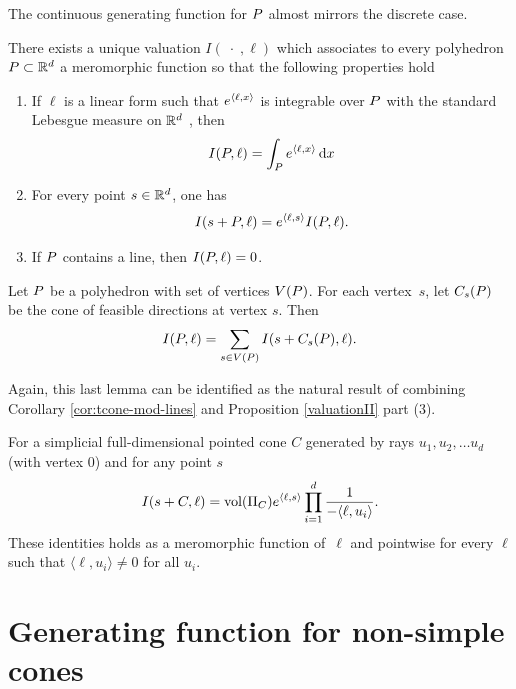 The continuous generating function for ${ P}$ almost mirrors the discrete case. 

\begin{proposition}\label{valuationII}
There exists a unique valuation  $I(\;\cdot\;, \ell)$ which  associates  to every polyhedron
${ P}\subset {\mathbb R}^d$ a meromorphic function so that the following properties hold 

\begin{enumerate}
\item If $\ell$ is a linear form such that $e^{{\langle} \ell, x {\rangle}}$ is integrable over ${ P}$ with the standard Lebesgue measure on ${\mathbb R}^d$ , then 
\[ I({ P},\ell) = \int_{ P} e^{{\langle} \ell, x {\rangle}} \,\mathrm{d} x\]
\item For every point $s \in {\mathbb R}^d$, one has
\[I(s+{ P}, \ell) = e^{{\langle} \ell, s {\rangle}}I({ P},\ell).\]
\item If ${ P}$ contains a line, then $I({ P}, \ell) = 0$.
\end{enumerate}
\end{proposition}


\begin{lemma}  Let ${ P}$ be a polyhedron with set of vertices $V({ P})$. For each
vertex~$s$, let $C_s({ P})$ be the cone of feasible directions at vertex $s$. Then
\begin{equation*}
I({ P},\ell)=\sum_{s\in V({ P})}I(s+C_s({ P}),\ell).
\end{equation*}
\end{lemma}

Again, this last lemma can be identified as the natural result of combining Corollary \ref{cor:tcone-mod-lines} and Proposition \ref{valuationII} part (3).

\begin{proposition} 
  \label{prop:integral-exp-simplicial}
  For a simplicial full-dimensional pointed cone $C$ generated by rays $u_1,u_2,\dots u_d$ (with vertex $0$) and for any point $s$
\begin{equation*}
I(s+C,\ell) = \text{vol} (\Pi_C)e^{{\langle} \ell, s {\rangle}} \prod_{i=1}^d \frac{1}{-{\langle} \ell, u_i {\rangle}}.
\end{equation*}
These identities holds as a meromorphic function of~$\ell$ 
and pointwise for every $\ell$ such that $\langle \ell, u_i \rangle \neq 0$ for
all $u_i$.
\end{proposition}

\section{Generating function for non-simple cones}

